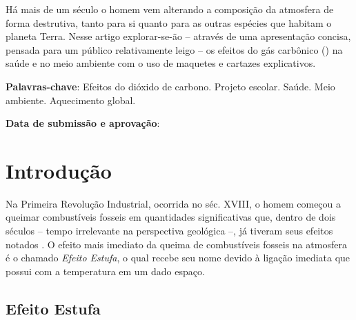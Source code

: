 \documentclass[article,11pt,oneside,a4paper,
	english,	%
	brazil,		%
	sumario=tradicional]{abntex2}
\begin{document}

\frenchspacing

\maketitle

\begin{resumoumacoluna}
	Há mais de um século o homem vem alterando a composição da atmosfera de forma destrutiva, tanto para si quanto para as outras espécies que habitam o planeta Terra. Nesse artigo explorar-se-ão -- através de uma apresentação concisa, pensada para um público relativamente leigo -- os efeitos do gás carbônico () na saúde e no meio ambiente com o uso de maquetes e cartazes explicativos.

	\vspace{\onelineskip}

	\noindent
	\textbf{Palavras-chave}: Efeitos do dióxido de carbono. Projeto escolar. Saúde. Meio ambiente. Aquecimento global.
\end{resumoumacoluna}


\begin{center}\smaller
	\textbf{Data de submissão e aprovação}:

\end{center}

\textual

\section{Introdução}

Na Primeira Revolução Industrial, ocorrida no séc. XVIII, o homem começou a queimar combustíveis fosseis em quantidades significativas que, dentro de dois séculos -- tempo irrelevante na perspectiva geológica --, já tiveram seus efeitos notados \cite{NASAevi,Hansen2010}. O efeito mais imediato da queima de combustíveis fosseis na atmosfera é o chamado \textit{Efeito Estufa}, o qual recebe seu nome devido à ligação imediata que possui com a temperatura em um dado espaço.


\subsection{Efeito Estufa}
\end{document}
